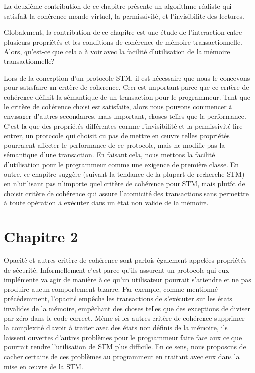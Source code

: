 La deuxième contribution de ce chapitre présente un algorithme réaliste qui satisfait la cohérence monde virtuel, la permissivité, et l'invisibilité des lectures.

Globalement, la contribution de ce chapitre est une étude de l'interaction entre plusieurs propriétés et les conditions de cohérence de mémoire transactionnelle.
Alors, qu'est-ce que cela a à voir avec la facilité d'utilisation de la mémoire transactionnelle?




Lors de la conception d'un protocole STM, il est nécessaire que nous le concevons pour satisfaire un critère de cohérence.
Ceci est important parce que ce critère de cohérence définit la sémantique de un transaction pour le programmeur.
Tant que le critère de cohérence choisi est satisfaite, alors nous pouvons commencer à envisager d'autres secondaires,
mais important, choses telles que la performance.
C'est là que des propriétés différentes comme l'invisibilité et la permissivité lire entrer,
un protocole qui choisit ou pas de mettre en œuvre telles propriétés pourraient affecter le performance de ce protocole, mais ne modifie pas la sémantique d'une transaction.
En faisant cela, nous mettons la facilité d'utilisation pour le programmeur comme une exigence de première classe.
En outre, ce chapitre suggère (suivant la tendance de la plupart de recherche STM) en n'utilisant pas n'importe quel critère de cohérence pour STM,
mais plutôt de choisir critère de cohérence qui assure l'atomicité des transactions sans permettre à toute opération à exécuter dans un état non valide de la mémoire.




\section{Chapitre 2}

Opacité et autres critère de cohérence sont parfois également appelées propriétés de sécurité.
Informellement c'est parce qu'ils assurent un protocole qui eux implémente va
agir de manière à ce qu'un utilisateur pourrait s'attendre et ne pas produire aucun comportement bizarre.
Par exemple, comme mentionné précédemment, l'opacité empêche les transactions de s'exécuter sur les états invalides de la mémoire, empêchant
des choses telles que des exceptions de diviser par zéro dans le code correct.
Même si les autres critère de cohérence supprimer la complexité d'avoir à traiter avec des états non définis de la mémoire,
ils laissent ouvertes d'autres problèmes pour le programmeur faire face aux ce que pourrait rendre l'utilisation de STM plus difficile.
En ce sens, nous proposons de cacher certains de ces problèmes au programmeur en traitant avec eux dans la mise en œuvre de la STM.




